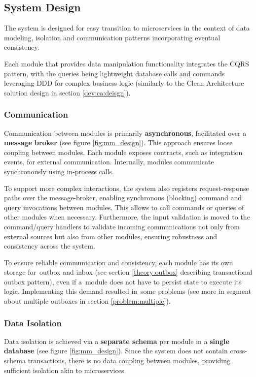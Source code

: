 \subsection{System Design}
The system is designed for easy transition to microservices in the context of data modeling, isolation and communication patterns incorporating eventual consistency.

Each module that provides data manipulation functionality integrates the CQRS pattern, with the queries being lightweight database calls and commands leveraging DDD for complex business logic (similarly to the Clean Architecture solution design in section \ref{dev:ca:deisgn}).

\subsubsection{Communication}
Communication between modules is primarily \textbf{asynchronous}, facilitated over a \textbf{message broker} (see figure \ref{fig:mm_design}). This approach ensures loose coupling between modules. Each module exposes contracts, such as integration events, for external communication. Internally, modules communicate synchronously using in-process calls.

To support more complex interactions, the system also registers request-response paths over the message-broker, enabling synchronous (blocking) command and query invocations between modules. This allows to call commands or queries of other modules when necessary. Furthermore, the input validation is moved to the command/query handlers to validate incoming communications not only from external sources but also from other modules, ensuring robustness and consistency across the system.

To ensure reliable communication and consistency, each module has its own storage for~outbox and inbox (see section \ref{theory:outbox} describing transactional outbox pattern), even if a~module does not have to persist state to execute its logic. Implementing this demand resulted in~some problems (see more in segment about multiple outboxes in section \ref{problem:multiple}).

\subsubsection{Data Isolation}
Data isolation is achieved via a \textbf{separate schema} per module in a \textbf{single database} (see figure \ref{fig:mm_design}). Since the system does not contain cross-schema transactions, there is no data coupling between modules, providing sufficient isolation akin to microservices. 

